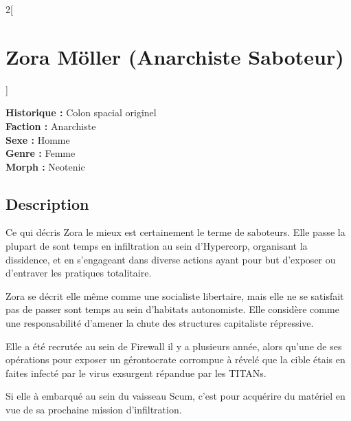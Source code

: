 \documentclass[a4paper,9pt]{article}
\begin{document}
\begin{multicols}{2}[\section*{Zora Möller (Anarchiste Saboteur)}]

   \noindent\textbf{Historique :} Colon spacial originel\\
   \noindent\textbf{Faction :} Anarchiste\\
   \noindent\textbf{Sexe :} Homme\\
   \noindent\textbf{Genre :} Femme\\
   \noindent\textbf{Morph :} Neotenic\\

   \subsection*{Description}

   Ce qui décris Zora le mieux est certainement le terme de saboteurs.
   Elle passe la plupart de sont temps en infiltration au sein d'Hypercorp,
   organisant la dissidence, et en s'engageant dans diverse actions ayant pour but
   d'exposer ou d'entraver les pratiques totalitaire.

   Zora se décrit elle même comme une socialiste libertaire, mais elle ne se satisfait
   pas de passer sont temps au sein d'habitats autonomiste.
   Elle considère comme une responsabilité d'amener la chute des structures capitaliste
   répressive.

   Elle a été recrutée au sein de Firewall il y a plusieurs année, alors qu'une de
   ses opérations pour exposer un gérontocrate corrompue à révelé que la cible étais en 
   faites infecté par le virus exsurgent répandue par les TITANs.

   Si elle à embarqué au sein du vaisseau Scum, c'est pour acquérire du
   matériel en vue de sa prochaine mission d'infiltration.


\end{multicols}
\end{document}
